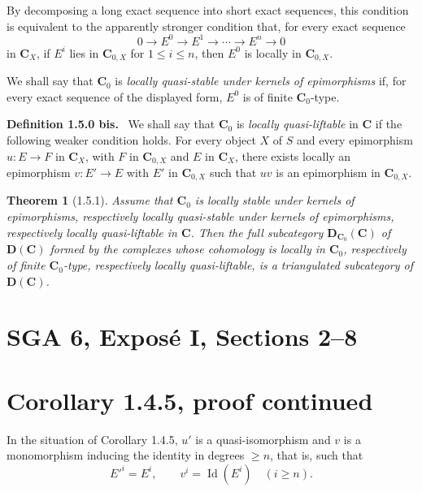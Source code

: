 \documentclass[11pt]{article}
\theoremstyle{plain}
\newtheorem*{theorem*}{Theorem}
\theoremstyle{definition}
\theoremstyle{remark}
\newenvironment{statement}[1]{\par\medskip\noindent\textbf{#1.}\ }{\par\medskip}
\begin{document}
By decomposing a long exact sequence into short exact sequences, this condition is equivalent to the apparently stronger condition that, for every exact sequence
\[
0\longrightarrow E^0\longrightarrow E^1\longrightarrow\cdots\longrightarrow E^n\longrightarrow0
\]
in $\mathbf C_X$, if $E^i$ lies in $\mathbf C_{0,X}$ for $1\le i\le n$, then $E^0$ is locally in $\mathbf C_{0,X}$.

We shall say that $\mathbf C_0$ is \emph{locally quasi-stable under kernels of epimorphisms} if, for every exact sequence of the displayed form, $E^0$ is of finite $\mathbf C_0$-type.

\begin{statement}{Definition 1.5.0 bis}
We shall say that $\mathbf C_0$ is \emph{locally quasi-liftable} in $\mathbf C$ if the following weaker condition holds. For every object $X$ of $S$ and every epimorphism $u:E\to F$ in $\mathbf C_X$, with $F$ in $\mathbf C_{0,X}$ and $E$ in $\mathbf C_X$, there exists locally an epimorphism $v:E'\to E$ with $E'$ in $\mathbf C_{0,X}$ such that $uv$ is an epimorphism in $\mathbf C_{0,X}$.
\end{statement}

\begin{theorem*}[1.5.1]
Assume that $\mathbf C_0$ is locally stable under kernels of epimorphisms, respectively locally quasi-stable under kernels of epimorphisms, respectively locally quasi-liftable in $\mathbf C$. Then the full subcategory $\mathbf D_{\mathbf C_0}(\mathbf C)$ of $\mathbf D(\mathbf C)$ formed by the complexes whose cohomology is locally in $\mathbf C_0$, respectively of finite $\mathbf C_0$-type, respectively locally quasi-liftable, is a triangulated subcategory of $\mathbf D(\mathbf C)$.
\end{theorem*}

\bigskip


\clearpage
\section*{SGA 6, Exposé I, Sections 2--8}

\section*{Corollary 1.4.5, proof continued}

In the situation of Corollary 1.4.5, $u'$ is a quasi-isomorphism and $v$ is a monomorphism inducing the identity in degrees $\geq n$, that is, such that
\[
E'^i=E^i,\qquad v^i=\operatorname{Id}(E^i)\quad (i\geq n).
\]
\end{document}
